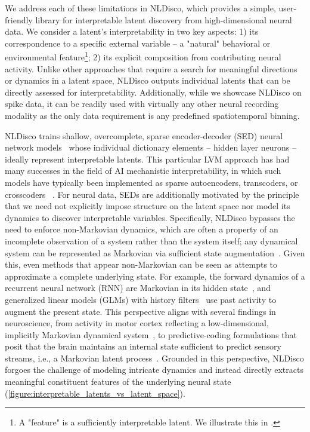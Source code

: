 We address each of these limitations in NLDisco, which provides a simple, user-friendly library for interpretable latent discovery from high-dimensional neural data. We consider a latent's interpretability in two key aspects: 1) its correspondence to a specific external variable -- a "natural" behavioral or environmental feature\footnote{A "feature" is a sufficiently interpretable latent. We illustrate this in .}; 2) its explicit composition from contributing neural activity. Unlike other approaches that require a search for meaningful directions or dynamics in a latent space, NLDisco outputs individual latents that can be directly assessed for interpretability. Additionally, while we showcase NLDisco on spike data, it can be readily used with virtually any other neural recording modality as the only data requirement is any predefined spatiotemporal binning.

NLDisco trains shallow, overcomplete, sparse encoder-decoder (SED) neural network models~\cite{olshausen_1997_sparse_overcomplete, vincent_2008_denoising_autoencoders} whose individual dictionary elements -- hidden layer neurons -- ideally represent interpretable latents. This particular LVM approach has had many successes in the field of AI mechanistic interpretability, in which such models have typically been implemented as sparse autoencoders, transcoders, or crosscoders ~\cite{lindsey_2024_crosscoders, cunningham_2023_saes, bricken_2023_towards_monosemanticity, templeton_2024_scaling_monosemanticity, dunefsky_2024_transcoders, ameisen_2025_circuit_tracing, lindsey_2025_biology_llm}. For neural data, SEDs are additionally motivated by the principle that we need not explicitly impose structure on the latent space nor model its dynamics to discover interpretable variables. Specifically, NLDisco bypasses the need to enforce non-Markovian dynamics, which are often a property of an incomplete observation of a system rather than the system itself; any dynamical system can be represented as Markovian via sufficient state augmentation~\cite{takens_1981_embedding}. Given this, even methods that appear non-Markovian can be seen as attempts to approximate a complete underlying state. For example, the forward dynamics of a recurrent neural network (RNN) are Markovian in its hidden state~\cite{sussillo_2013_rnn_dynamics, goodfellow_2016_rnn}, and generalized linear models (GLMs) with history filters~\cite{pillow_2008_glms, truccolo_2005_pointprocess} use past activity to augment the present state. This perspective aligns with several findings in neuroscience, from activity in motor cortex reflecting a low-dimensional, implicitly Markovian dynamical system~\cite{churchland_2012_population_dynamics, shenoy_2013_dynamical_perspective}, to predictive-coding formulations that posit that the brain maintains an internal state sufficient to predict sensory streams, i.e., a Markovian latent process~\cite{rao_1999_predictive_coding, doya_2007_bayesian_brain, friston_2010_free_energy}. Grounded in this perspective, NLDisco forgoes the challenge of modeling intricate dynamics and instead directly extracts meaningful constituent features of the underlying neural state (\autoref{figure:interpretable_latents_vs_latent_space}).
